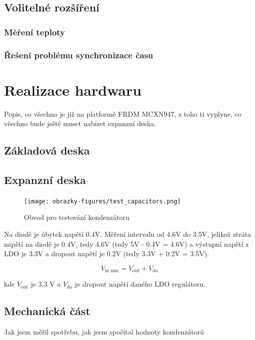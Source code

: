 
\section{Volitelné rozšíření}
\subsection{Měření teploty}


\subsection{Řešení problému synchronizace času}


\chapter{Realizace hardwaru}
\label{realizace_hardwaru}
Popis, co všechno je již na platformě FRDM MCXN947, z toho ti vyplyne, co všechno bude ještě muset nabízet expanzní deska.
\section{Základová deska}

\section{Expanzní deska}

\begin{figure}[h]
    \centering
    \texttt{[image: obrazky-figures/test\_capacitors.png]}
    
    \caption{Obvod pro testování kondenzátoru}
    \label{fig:test-capacitors}
\end{figure}

Na diodě je úbytek napětí 0.4V. Měření intervalu od 4.6V do 3.5V, jelikož ztráta napětí na diodě je 0.4V, tedy 4.6V (tedy 5V - 0.4V = 4.6V) a výstupní napětí z LDO je 3.3V a dropout napětí je 0.2V (tedy 3.3V + 0.2V = 3.5V).

\[
V_{\text{in min}} = V_{\text{out}} + V_{\text{do}}
\]

kde \(V_{\text{out}}\) je 3,3 V a \(V_{\text{do}}\) je dropout napětí daného LDO regulátoru.


\section{Mechanická část}
Jak jsem měřil spotřebu, jak jsem spočítal hodnoty kondenzátorů

